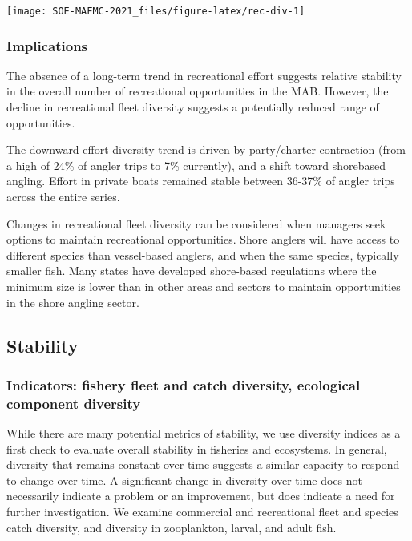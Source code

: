 \documentclass[
  10pt,
]{article}
\let\origfigure\figure
\let\endorigfigure\endfigure
\renewenvironment{figure}[1][2] {
    \expandafter\origfigure\expandafter[H]
} {
    \endorigfigure
}
\begin{document}
\begin{figure}

{\centering \texttt{[image: SOE-MAFMC-2021\_files/figure-latex/rec-div-1]} 

}

\caption{Recreational fleet effort diversity in the Mid-Atlantic.}\label{fig:rec-div}
\end{figure}

\hypertarget{implications-2}{%
\subsubsection{Implications}\label{implications-2}}

The absence of a long-term trend in recreational effort suggests
relative stability in the overall number of recreational opportunities
in the MAB. However, the decline in recreational fleet diversity
suggests a potentially reduced range of opportunities.

The downward effort diversity trend is driven by party/charter
contraction (from a high of 24\% of angler trips to 7\% currently), and
a shift toward shorebased angling. Effort in private boats remained
stable between 36-37\% of angler trips across the entire series.

Changes in recreational fleet diversity can be considered when managers
seek options to maintain recreational opportunities. Shore anglers will
have access to different species than vessel-based anglers, and when the
same species, typically smaller fish. Many states have developed
shore-based regulations where the minimum size is lower than in other
areas and sectors to maintain opportunities in the shore angling sector.

\hypertarget{stability}{%
\subsection{Stability}\label{stability}}

\hypertarget{indicators-fishery-fleet-and-catch-diversity-ecological-component-diversity}{%
\subsubsection{Indicators: fishery fleet and catch diversity, ecological
component
diversity}\label{indicators-fishery-fleet-and-catch-diversity-ecological-component-diversity}}

While there are many potential metrics of stability, we use diversity
indices as a first check to evaluate overall stability in fisheries and
ecosystems. In general, diversity that remains constant over time
suggests a similar capacity to respond to change over time. A
significant change in diversity over time does not necessarily indicate
a problem or an improvement, but does indicate a need for further
investigation. We examine commercial and recreational fleet and species
catch diversity, and diversity in zooplankton, larval, and adult fish.
\end{document}
